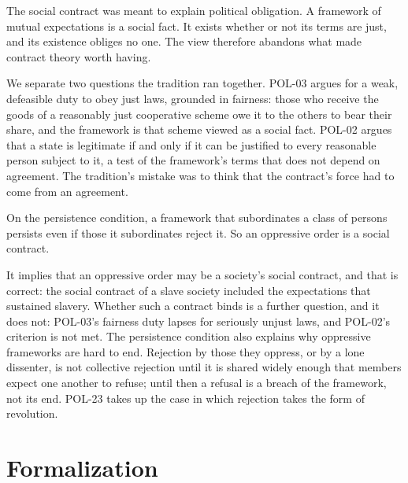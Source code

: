 \documentclass{situationist-preprint}
\begin{document}
\begin{objection}
The social contract was meant to explain political obligation. A framework of mutual expectations is a social fact. It exists whether or not its terms are just, and its existence obliges no one. The view therefore abandons what made contract theory worth having.
\end{objection}

\begin{reply}
We separate two questions the tradition ran together. POL-03 argues for a weak, defeasible duty to obey just laws, grounded in fairness: those who receive the goods of a reasonably just cooperative scheme owe it to the others to bear their share, and the framework is that scheme viewed as a social fact. POL-02 argues that a state is legitimate if and only if it can be justified to every reasonable person subject to it, a test of the framework's terms that does not depend on agreement. The tradition's mistake was to think that the contract's force had to come from an agreement.
\end{reply}

\begin{objection}
On the persistence condition, a framework that subordinates a class of persons persists even if those it subordinates reject it. So an oppressive order is a social contract.
\end{objection}

\begin{reply}
It implies that an oppressive order may be a society's social contract, and that is correct: the social contract of a slave society included the expectations that sustained slavery. Whether such a contract binds is a further question, and it does not: POL-03's fairness duty lapses for seriously unjust laws, and POL-02's criterion is not met. The persistence condition also explains why oppressive frameworks are hard to end. Rejection by those they oppress, or by a lone dissenter, is not collective rejection until it is shared widely enough that members expect one another to refuse; until then a refusal is a breach of the framework, not its end. POL-23 takes up the case in which rejection takes the form of revolution.
\end{reply}

\section{Formalization}
\end{document}
